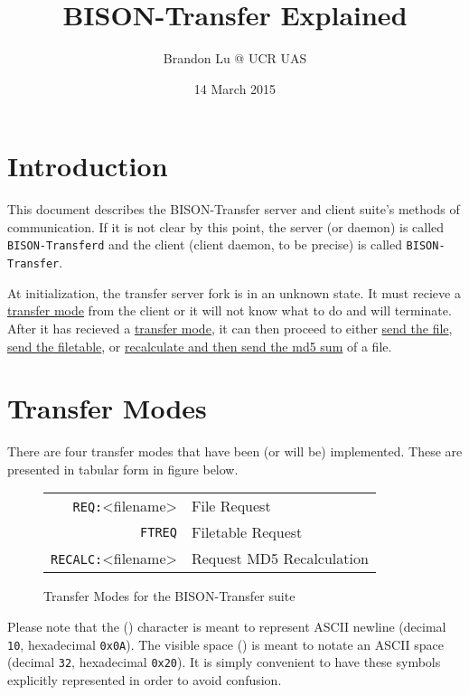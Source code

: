 \documentclass[12pt]{article}
\author{Brandon Lu @ UCR UAS}
\title{BISON-Transfer Explained}
\date{14 March 2015}
\begin{document}
\maketitle
\section{Introduction}
This document describes the BISON-Transfer server and client suite's methods
of communication.  If it is not clear by this point, the server (or daemon)
is called \verb+BISON-Transferd+ and the client (client daemon, to be precise)
is called \verb+BISON-Transfer+.

At initialization, the transfer server fork is in an unknown state.  It must
recieve a \hyperref[sec:Transfer Modes]{transfer mode} from the client or it
will not know what to
do and will terminate.
After it has recieved a \hyperref[sec:Transfer Modes]{transfer mode}, it can
then proceed to either \hyperref[ssec:Request File]{send the file},
\hyperref[ssec:Request Filetable]{send the filetable},
or \hyperref[ssec:Recalculate MD5]
{recalculate and then send the md5 sum} of a file. 

\tableofcontents

\section{Transfer Modes}
\label{sec:Transfer Modes}
There are four transfer modes that have been (or will be) implemented.
These are presented in tabular form in figure below.
\begin{figure}[H]
	\centering
	\begin{tabular}{r l}
		\verb+REQ:+\textvisiblespace <filename>\carriagereturn\carriagereturn
		& File Request\\
		\verb+FTREQ+\carriagereturn\carriagereturn & Filetable Request \\
		\verb+RECALC:+\textvisiblespace <filename>\carriagereturn
		\carriagereturn & Request MD5 Recalculation
	\end{tabular}
	\label{fig:Transfer Modes}
	\caption{Transfer Modes for the BISON-Transfer suite}
\end{figure}

Please note that the (\carriagereturn) character is meant to represent ASCII
newline (decimal \verb+10+, hexadecimal \verb+0x0A+).  The
visible space (\textvisiblespace) is meant to notate an ASCII space (decimal
\verb+32+, hexadecimal \verb+0x20+).
It is simply convenient to have these symbols explicitly represented in order
to avoid confusion.
\end{document}
